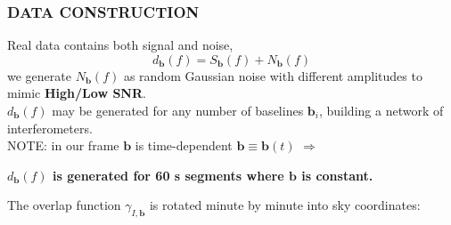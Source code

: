 \documentclass[handout]{beamer}
\begin{document}
\begin{frame}
	\frametitle{DATA CONSTRUCTION}
	Real data contains both signal and noise,
     \begin{equation}
	d_{\bm{b}}(f) = S_{\bm{b}}(f)+N_{\bm{b}}(f)
	\end{equation}
    we generate $N_\bm{b}(f)$ as random Gaussian noise with different amplitudes to mimic \textbf{High/Low SNR}. \\
    \smallskip
     $d_{\bm{b}}(f)$ may be generated for any number of baselines $\bm b_i$, building a network of interferometers. \\
    \medskip
    NOTE: in our frame $\bm b$ is time-dependent  $\bm b \equiv \bm b (t)$ $\Rightarrow$
    \begin{block}{}
\centering
\textcolor{textcol}{\bf $d_{\bm{b}}(f)$ is generated for 60 s segments where $\bm b$ is constant. }
\end{block}
\medskip 
The overlap function $\gamma_{I, \bm{b}}$ is rotated minute by minute into sky coordinates:
\end{frame}
\end{document}
